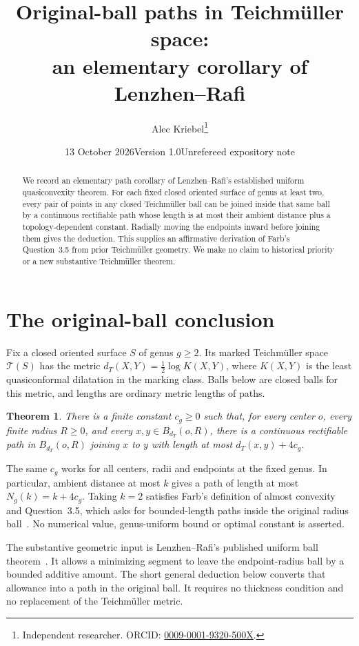 \documentclass[10pt]{article}
\title{Original-ball paths in Teichm\"uller space:\\
an elementary corollary of Lenzhen--Rafi}
\author{Alec Kriebel\thanks{Independent researcher. ORCID:
\href{https://orcid.org/0009-0001-9320-500X}{0009-0001-9320-500X}.}}
\date{13 October 2026\quad Version 1.0\quad Unrefereed expository note}
\newtheorem{theorem}{Theorem}
\newcommand{\TT}{\mathcal T}
\begin{document}
\maketitle
\begin{abstract}
We record an elementary path corollary of Lenzhen--Rafi's established
uniform quasiconvexity theorem. For each fixed closed oriented surface of
genus at least two, every pair of points in any closed Teichm\"uller ball
can be joined inside that same ball by a continuous rectifiable path whose
length is at most their ambient distance plus a topology-dependent
constant. Radially moving the endpoints inward before joining them gives
the deduction. This supplies an affirmative derivation of Farb's
Question~3.5 from prior Teichm\"uller geometry. We make no claim to
historical priority or a new substantive Teichm\"uller theorem.
\end{abstract}

\section{The original-ball conclusion}
Fix a closed oriented surface $S$ of genus $g\geq2$. Its marked
Teichm\"uller space $\TT(S)$ has the metric
$d_T(X,Y)=\tfrac12\log K(X,Y)$, where $K(X,Y)$ is the least
quasiconformal dilatation in the marking class. Balls below are closed
balls for this metric, and lengths are ordinary metric lengths of paths.

\begin{theorem}\label{thm:main}
There is a finite constant $c_g\geq0$ such that, for every center $o$,
every finite radius $R\geq0$, and every $x,y\in B_{d_T}(o,R)$, there is
a continuous rectifiable path in $B_{d_T}(o,R)$ joining $x$ to $y$ with
length at most $d_T(x,y)+4c_g$.
\end{theorem}

The same $c_g$ works for all centers, radii and endpoints at the fixed
genus. In particular, ambient distance at most $k$ gives a path of length
at most $N_g(k)=k+4c_g$. Taking $k=2$ satisfies Farb's definition of
almost convexity and Question~3.5, which asks for bounded-length paths
inside the original radius ball~\cite[pp.~24--25]{Farb}.
No numerical value, genus-uniform bound or optimal constant is asserted.

The substantive geometric input is Lenzhen--Rafi's published uniform ball
theorem~\cite[Theorems~C and~17]{LR}. It allows a minimizing segment to
leave the endpoint-radius ball by a bounded additive amount. The short
general deduction below converts that allowance into a path in the
original ball. It requires no thickness condition and no replacement of
the Teichm\"uller metric.
\end{document}
